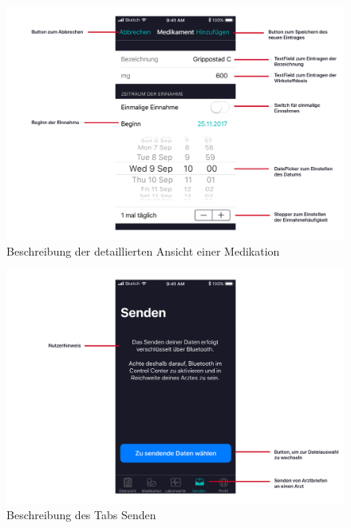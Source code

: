 \documentclass[a4paper]{scrreprt}
\begin{document}
\begin{figure}
\includegraphics[width=1\textwidth]{graphics/UIDescriptions/DetailedMedicationDesc}
\caption{Beschreibung der detaillierten Ansicht einer Medikation}
\end{figure}

\begin{figure}
\includegraphics[width=1\textwidth]{graphics/UIDescriptions/SendDataDesc}
\caption{Beschreibung des Tabs \dq Senden\dq{}}
\end{figure}
\end{document}
